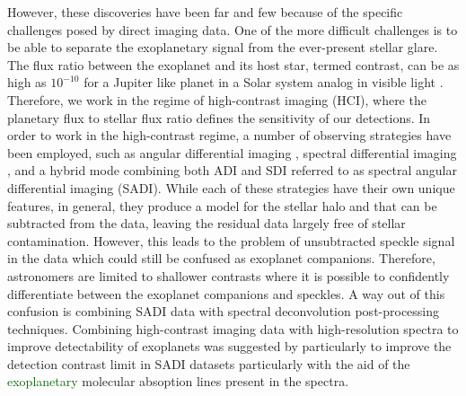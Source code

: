 \documentclass{aa}
\newcommand{\newchange}[1]{\textcolor{darkgreen}{#1}}
\begin{document}
However, these discoveries have been far and few because of the specific challenges posed by direct imaging data.
One of the more difficult challenges is to be able to separate the exoplanetary signal from the ever-present stellar glare.
The flux ratio between the exoplanet and its host star, termed contrast, can be as high as $10^{-10}$ for a Jupiter like planet in a Solar system analog in visible light \citep[ for e.g][]{2023Galicher}.
Therefore, we work in the regime of high-contrast imaging (HCI), where the planetary flux to stellar flux ratio defines the sensitivity of our detections.
In order to work in the high-contrast regime, a number of observing strategies have been employed, such as angular differential imaging \citep[ADI, ][]{Liu2004,2006MaroisADI}, spectral differential imaging \citep[SDI, ][]{2002SparksSDI}, and a hybrid mode combining both ADI and SDI referred to as spectral angular differential imaging (SADI).
While each of these strategies have their own unique features, in general, they produce a model for the stellar halo and that can be subtracted from the data, leaving the residual data largely free of stellar contamination.
However, this leads to the problem of unsubtracted speckle signal in the data which could still be confused as exoplanet companions.
Therefore, astronomers are limited to shallower contrasts where it is possible to confidently differentiate between the exoplanet companions and speckles.
A way out of this confusion is combining SADI data with spectral deconvolution post-processing techniques\cite[as for e.g. in, ][]{2002SparksSDI, 2007ThatteSDI}.
Combining high-contrast imaging data with high-resolution spectra to improve detectability of exoplanets was suggested by\cite{2015Snellen} particularly to improve the detection contrast limit in SADI datasets particularly with the aid of the \newchange{exoplanetary} molecular absoption lines present in the spectra.
\end{document}
